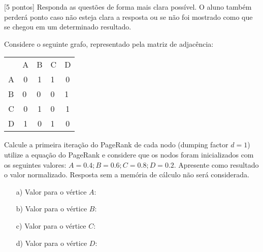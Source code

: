 \documentclass[16pt]{examdesign}
\begin{document}
\begin{fillin}[title={},
                    rearrange=no,resetcounter=no,suppressprefix]

[5 pontos] 
          Responda as questões de forma mais clara possível.
          O aluno também perderá ponto caso não esteja clara a resposta ou se não foi mostrado como que se chegou em um determinado resultado.
  \begin{question}
	  Considere o seguinte grafo, representado pela matriz de adjacência:
	  
	  \begin{center}
	  \begin{tabular}{ccclc}
                       & A                      & B                      & C                      & D                      \\ \cline{2-5} 
\multicolumn{1}{c|}{A} & \multicolumn{1}{c|}{0} & \multicolumn{1}{c|}{1} & \multicolumn{1}{l|}{1} & \multicolumn{1}{c|}{0} \\ \cline{2-5} 
\multicolumn{1}{l|}{B} & \multicolumn{1}{l|}{0} & \multicolumn{1}{l|}{0} & \multicolumn{1}{l|}{0} & \multicolumn{1}{l|}{1} \\ \cline{2-5} 
\multicolumn{1}{c|}{C} & \multicolumn{1}{c|}{0} & \multicolumn{1}{c|}{1} & \multicolumn{1}{l|}{0} & \multicolumn{1}{c|}{1} \\ \cline{2-5} 
\multicolumn{1}{c|}{D} & \multicolumn{1}{c|}{1} & \multicolumn{1}{c|}{0} & \multicolumn{1}{l|}{1} & \multicolumn{1}{c|}{0} \\ \cline{2-5} 
\end{tabular}
\end{center}
	  
	  Calcule a primeira iteração do PageRank de cada nodo (dumping factor $d = 1$) utilize a equação do PageRank e considere que os nodos 
	  foram inicializados com os seguintes valores: $A=0.4; B=0.6; C=0.8; D=0.2$. Apresente como resultado o valor normalizado. 
	  Resposta sem a memória de cálculo não será considerada.\\
	  
      \begin{multicols}{2}[]
	    \begin{enumerate}
	    \item[a)] Valor para o vértice $A$:  
	    \item[b)] Valor para o vértice $B$:  
	    \item[c)] Valor para o vértice $C$:  
	    \item[d)] Valor para o vértice $D$:  
	    \end{enumerate}
      \end{multicols}


\end{question}
\end{fillin}
\end{document}
